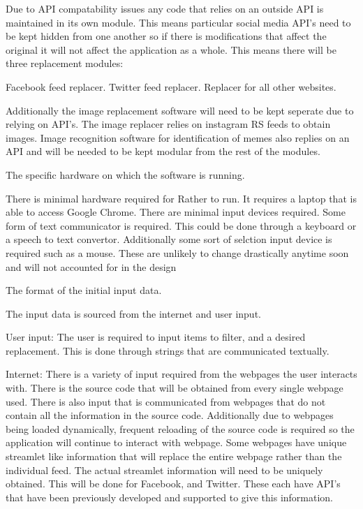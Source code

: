 \documentclass[12pt, titlepage]{article}
\newcounter{acnum}
\newcommand{\actheacnum}{AC\theacnum}
\begin{document}
Due to API compatability issues any code that relies on an outside API is maintained in its own module. This means particular social media API's need to be kept hidden from one another so if there is modifications that affect the original it will not affect the application as a whole. This means there will be three replacement modules:

Facebook feed replacer.
Twitter feed replacer.
Replacer for all other websites.

Additionally the image replacement software will need to be kept seperate due to relying on API's. The image replacer relies on instagram RS feeds to obtain images. Image recognition software for identification of memes also replies on an API and will be needed to be kept modular from the rest of the modules. 
\begin{description}
\item[ \actheacnum \label{acHardware}:] The specific
  hardware on which the software is running.

There is minimal hardware required for Rather to run. It requires a laptop that is able to access Google Chrome. There are minimal input devices required. Some form of text communicator is required. This could be done through a keyboard or a speech to text convertor. Additionally some sort of selction input device is required such as a mouse. These are unlikely to change drastically anytime soon and will not accounted for in the design 
\item[ \actheacnum \label{acInput}:] The format of the
  initial input data.
\item The input data is sourced from the internet and user input. 

User input:
The user is required to input items to filter, and a desired replacement. This is done through strings that are communicated textually.

Internet: There is a variety of input required from the webpages the user interacts with. There is the source code that will be obtained from every single webpage used. There is also input that is communicated from webpages that do not contain all the information in the source code. Additionally due to webpages being loaded dynamically, frequent reloading of the source code is required so the application will continue to interact with webpage. Some webpages have unique streamlet like information that will replace the entire webpage rather than the individual feed. The actual streamlet information will need to be uniquely obtained. This will be done for Facebook, and Twitter. These each have API's that have been previously developed and supported to give this information.  
\end{description}
\end{document}
